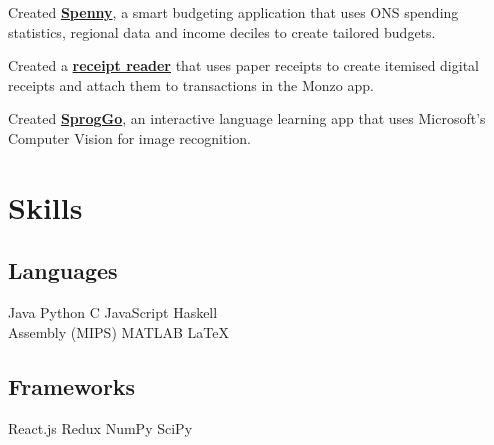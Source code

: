 \documentclass[]{deedy-resume-openfont}
\begin{document}
\begin{minipage}[t]{0.33\textwidth}
Created \href{https://github.com/kimbethstonehouse/spenny}{\bf Spenny}, a smart budgeting application that uses ONS spending statistics, regional data and income deciles to create tailored budgets.
\sectionsep

Created a \href{https://github.com/kimbethstonehouse/monzo-receipt-reader}{\bf receipt reader} that uses paper receipts to create itemised digital receipts and attach them to transactions in the Monzo app.
\sectionsep

Created \href{https://github.com/kimbethstonehouse/SprogGo}{\bf SprogGo}, an interactive language learning app that uses Microsoft's Computer Vision for image recognition.
\sectionsep


\section{Skills}
\subsection{Languages}
Java \textbullet{} Python \textbullet{} C \textbullet{} JavaScript \textbullet{} 
Haskell \\ Assembly (MIPS) \textbullet{} MATLAB \textbullet{} \LaTeX \\
\sectionsep

\subsection{Frameworks}
React.js \textbullet{} Redux \textbullet{} NumPy \textbullet{} SciPy

%
%

\end{minipage} 
\hfill
\end{document}
